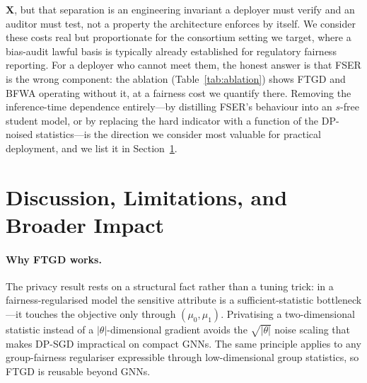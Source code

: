 \documentclass[pdflatex,sn-mathphys-num]{sn-jnl}
\theoremstyle{thmstyleone}%
\theoremstyle{thmstyletwo}%
\theoremstyle{thmstylethree}%
\begin{document}
$\mathbf{X}$, but that separation is an engineering invariant a deployer must
verify and an auditor must test, not a property the architecture enforces by
itself.
We consider these costs real but proportionate for the consortium setting we
target, where a bias-audit lawful basis is typically already established for
regulatory fairness reporting. For a deployer who cannot meet them, the honest
answer is that FSER is the wrong component: the ablation
(Table~\ref{tab:ablation}) shows FTGD and BFWA operating without it, at a
fairness cost we quantify there. Removing the inference-time dependence
entirely---by distilling FSER's behaviour into an $s$-free student model, or by
replacing the hard indicator with a function of the DP-noised statistics---is
the direction we consider most valuable for practical deployment, and we list it
in Section~\ref{sec:discussion}.

\begin{table}[t]\centering\small
\caption{Mapping of TrustFedGNN components to EU AI Act articles and NIST AI RMF
functions.}
\label{tab:compliance}

\end{table}

\section{Discussion, Limitations, and Broader Impact}
\label{sec:discussion}

\paragraph{Why FTGD works.}
The privacy result rests on a structural fact rather than a tuning trick: in a
fairness-regularised model the sensitive attribute is a sufficient-statistic
bottleneck---it touches the objective only through $(\mu_0,\mu_1)$. Privatising
a two-dimensional statistic instead of a $|\theta|$-dimensional gradient avoids
the $\sqrt{|\theta|}$ noise scaling that makes DP-SGD impractical on compact
GNNs. The same principle applies to any group-fairness regulariser expressible
through low-dimensional group statistics, so FTGD is reusable beyond GNNs.
\end{document}
